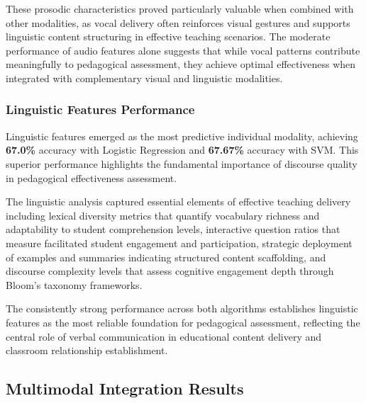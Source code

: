 These prosodic characteristics proved particularly valuable when combined with other modalities, as vocal delivery often reinforces visual gestures and supports linguistic content structuring in effective teaching scenarios. The moderate performance of audio features alone suggests that while vocal patterns contribute meaningfully to pedagogical assessment, they achieve optimal effectiveness when integrated with complementary visual and linguistic modalities.

\subsubsection{Linguistic Features Performance}

Linguistic features emerged as the most predictive individual modality, achieving \textbf{67.0\%} accuracy with Logistic Regression and \textbf{67.67\%} accuracy with SVM. This superior performance highlights the fundamental importance of discourse quality in pedagogical effectiveness assessment.

The linguistic analysis captured essential elements of effective teaching delivery including lexical diversity metrics that quantify vocabulary richness and adaptability to student comprehension levels, interactive question ratios that measure facilitated student engagement and participation, strategic deployment of examples and summaries indicating structured content scaffolding, and discourse complexity levels that assess cognitive engagement depth through Bloom's taxonomy frameworks.

The consistently strong performance across both algorithms establishes linguistic features as the most reliable foundation for pedagogical assessment, reflecting the central role of verbal communication in educational content delivery and classroom relationship establishment.

\subsection{Multimodal Integration Results}

